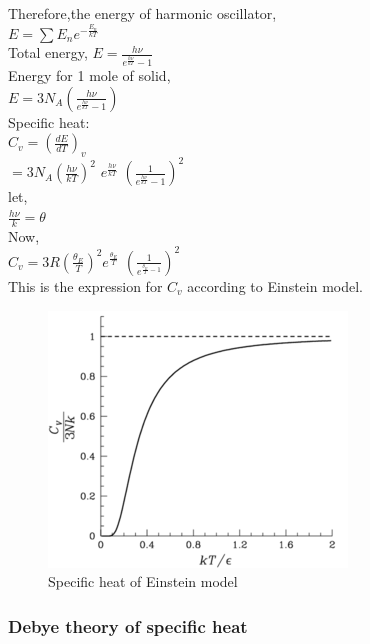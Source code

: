 \documentclass{article}
\newcommand*{\1}{\hspace{1pt}}
\begin{document}
Therefore,the energy of harmonic oscillator,\\

 $E=\sum E_n e^{-\frac{E_n}{kT}}$\\
 
 Total energy,
 $E=\frac{h\nu}{e^{\frac{h\nu}{kT}}-1}$\\

Energy for 1 mole of solid,\\

$E=3N_A(\frac{h\nu}{e^{\frac{h\nu}{kT}}-1})$\\

Specific heat:\\

$C_v=(\frac{dE}{dT})_v$\\

 $ =3N_A(\frac{h\nu}{kT})^2$
 ${e^{\frac{h\nu}{kT}}}$
$(\frac{1}{e^{\frac{h\nu}{kT}}-1})^2$\\

let,\\

$\frac{h\nu}{k}=\theta$\\

Now,\\

    $C_v=3R(\frac{\theta_E}{T})^2{e^{\frac{\theta_E}{T}}} $
    $(\frac{1}{e^{\frac{\theta_E}{T}-1}})^2$\\
    
This is the expression for $C_v$ according to Einstein model.\\


\begin{figure}[h!]
    \centering
    \includegraphics[scale=0.7]{cv for einstein}
    \caption{Specific heat of Einstein model}
    \label{fig:my_label}
\end{figure}

\subsubsection{\textbf{Debye theory of specific heat}}
\end{document}
